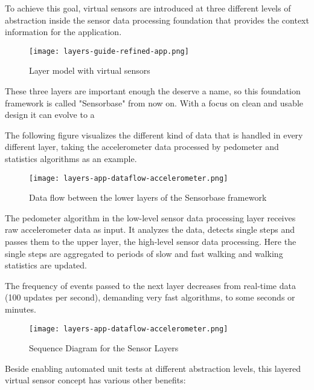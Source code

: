 To achieve this goal, virtual sensors are introduced at three different levels of abstraction inside the sensor data processing foundation that provides the context information for the application.
 
\begin{figure}[H]
\centering
\texttt{[image: layers-guide-refined-app.png]}
\caption{Layer model with virtual sensors}
\end{figure}

These three layers are important enough the deserve a name, so this foundation framework is called "Sensorbase" from now on. With a focus on clean and usable design it can evolve to a 

The following figure visualizes the different kind of data that is handled in every different layer, taking the accelerometer data processed by pedometer and statistics algorithms as an example. 

\begin{figure}[H]
\centering
\texttt{[image: layers-app-dataflow-accelerometer.png]}
\caption{Data flow between the lower layers of the Sensorbase framework}
\end{figure}

The pedometer algorithm in the low-level sensor data processing layer receives raw accelerometer data as input. It analyzes the data, detects single steps and passes them to the upper layer, the high-level sensor data processing. Here the single steps are aggregated to periods of slow and fast walking and walking statistics are updated.

The frequency of events passed to the next layer decreases from real-time data (100 updates per second), demanding very fast algorithms, to some seconds or minutes.

\begin{figure}[H]
\centering
\texttt{[image: layers-app-dataflow-accelerometer.png]}
\caption{Sequence Diagram for the Sensor Layers}
\end{figure}

Beside enabling automated unit tests at different abstraction levels, this layered virtual sensor concept has various other benefits:

